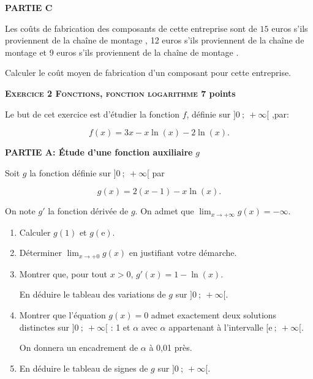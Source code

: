 \documentclass[11pt]{article}
\begin{document}
\medskip

\textbf{PARTIE C}

\medskip

Les coûts de fabrication des composants de cette entreprise sont de $15$ euros s'ils proviennent de la chaîne de montage , 12 euros s'ils proviennent de la chaîne de montage  et 9 euros s'ils proviennent de la chaîne de montage .

Calculer le coût moyen de fabrication d'un composant pour cette entreprise.

\bigskip

\textbf{\textsc{Exercice 2 Fonctions, fonction logarithme} \hfill 7 points}

\medskip

Le but de cet exercice est d'étudier la fonction $f$, définie sur $]0~;~ +\infty[$ ,par:

\[f(x) =3x - x \ln (x) - 2 \ln (x).\]

\smallskip

\textbf{PARTIE A: Étude d'une fonction auxiliaire }\boldmath $g$ \unboldmath

\medskip

Soit $g$ la fonction définie sur $]0~;~ +\infty[$ par 

\[g(x) = 2(x - 1) - x \ln (x).\]

On note $g'$ la fonction dérivée de $g$. On admet que $\displaystyle\lim_{x \to + \infty} g(x) = - \infty$.

\medskip

\begin{enumerate}
\item Calculer $g(1)$ et $g(\text{e})$.
\item Déterminer $\displaystyle\lim_{x \to + 0} g(x)$ en justifiant votre démarche.
\item Montrer que, pour tout $x > 0$,\: $g'(x) = 1 - \ln (x)$.

En déduire le tableau des variations de $g$ sur $]0~;~ +\infty[$.
\item Montrer que l'équation $g(x) = 0$ admet exactement deux solutions distinctes sur
$]0~;~ +\infty[$ : 1 et $\alpha$ avec $\alpha$ appartenant à l'intervalle $[\text{e}~;~+\infty[$.

On donnera un encadrement de $\alpha$ à 0,01 près.
\item En déduire le tableau de signes de $g$ sur $]0~;~ +\infty[$. 
\end{enumerate}

\bigskip
\end{document}

